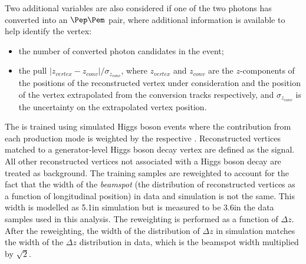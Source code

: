 Two additional variables are also considered if one of the two photons has converted into an $\Pep\Pem$ pair, where additional information is available to help identify the vertex:
\begin{itemize}
\item the number of converted photon candidates in the event;
\item the pull $|z_{vertex} - z_{conv}|/\sigma_{z_{conv}} $, where $z_{vertex}$ and $ z_{conv}$ are the $z$-components of the positions of the reconstructed vertex under consideration and the position of the vertex extrapolated from the conversion tracks respectively, and $\sigma_{z_{conv}} $ is the uncertainty on the extrapolated vertex position.
\end{itemize}

The \VtxIdBdt is trained using simulated Higgs boson events %
where the contribution from each production mode is weighted by the respective \SM \crosssection. Reconstructed vertices matched to a generator-level Higgs boson decay vertex are defined as the signal. All other reconstructed vertices not associated with a Higgs boson decay are treated as background. The training samples are reweighted to account for the fact that the width of the \emph{beamspot} (the distribution of reconstructed vertices as a function of longitudinal position) in data and simulation is not the same. This width is modelled as 5.1\cm in simulation but is measured to be 3.6\cm in the data samples used in this analysis. The reweighting is performed as a function of $\Delta z$. After the reweighting, the width of the distribution of $\Delta z$ in simulation matches the width of the $\Delta z$ distribution in data, which is the beamspot width multiplied by $\sqrt{2}$.

